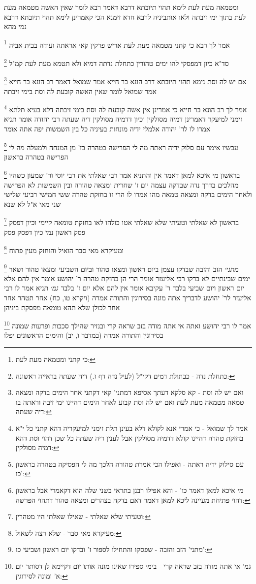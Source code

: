 \documentclass[12pt, openany]{book}
\newcommand{\footnotecomment}[1]{
	\renewcommand\thefootnote{}
	\footnote{#1}}
\newcommand{\commenta}[1]{\footnotecomment{#1}}
\begin{document}
{{ומטמאה מעת לעת לימא תהוי תיובתא דרבא דאמר רבא לומר שאין האשה מטמאה מעת לעת בתוך ימי זיבתה 
ולאו אותביניה לרבא חדא זימנא הכי קאמרינן לימא תהוי תיובתא דרבא נמי מהא 
\commenta{כי קתני ומטמאה מעת לעת:}
אמר לך רבא כי קתני מטמאה מעת לעת אריש פרקין קאי אראתה ועודה בבית אביה 
\commenta{כתחלת נדה - כבתולת דמים דקי"ל (לעיל נדה דף ז.) דיה שעתה בראייה ראשונה:}
סד"א כיון דמפסקי להו ימים טהורין כתחלת נדתה דמיא ולא תטמא מעת לעת קמ"ל
\commenta{ואם יש לה וסת - קא סלקא דעתך אסיפא דמתני' קאי דקתני אחר הימים בדקה ומצאה טמאה מטמאה מעת לעת ואם יש לה וסת קבוע לאחר הימים דהיינו ימי זיבה וראתה בו דיה שעתה:}
אם יש לה וסת נימא תהוי תיובתא דרב הונא בר חייא אמר שמואל דאמר רב הונא בר חייא אמר שמואל לומר שאין האשה קובעת לה וסת בימי זיבתה 
\commenta{אמר לך שמואל - כי אמרי אנא לקולא דלא בעינן תלת זימני למיעקריה דהא קתני כל י"א בחזקת טהרה דהיינו קולא דדמיה מסולקין אבל לענין דיה שעתה כל שכן דהוי וסת דהא דמיה מסולקין:}
אמר לך רב הונא בר חייא כי אמרינן אין אשה קובעת לה וסת בימי זיבתה דלא בעיא תלתא זימני למיעקר דאמרינן דמיה מסולקין וכיון דדמיה מסולקין דיה שעתה
רבי יהודה אומר תניא אמרו לו לר' יהודה אלמלי ידיה מונחות בעיניה כל בין השמשות יפה אתה אומר
\commenta{עם סילוק ידיה ראתה - ואפילו הכי אמרת טהורה הלכך מה לי הפסיקה בטהרה בראשון כו':}
עכשיו אימר עם סלוק ידיה ראתה מה לי הפרישה בטהרה בז' מן המנחה ולמעלה מה לי הפרישה בטהרה בראשון 
\commenta{מי איכא למאן דאמר כו' - והא אפילו רבנן בתראי בשני שלה הוא דקאמרי אבל בראשון דהוי פתיחת מעיינה ליכא למאן דאמר דאם בדקה בצהרים ומצאה טהור דתהוי הפרשה:}
בראשון מי איכא למאן דאמר 
אין והתניא אמר רבי שאלתי את רבי יוסי ור' שמעון כשהיו מהלכים בדרך נדה שבדקה עצמה יום ז' שחרית ומצאה טהורה ובין השמשות לא הפרישה ולאחר הימים בדקה ומצאה טמאה מהו 
אמרו לו הרי זו בחזקת טהרה ששי חמישי רביעי שלישי שני מאי א"ל לא שנא 
\commenta{וטעיתי שלא שאלתי - שאילו שאלתי היו מטהרין:}
בראשון לא שאלתי וטעיתי שלא שאלתי אטו כולהו לאו בחזקת טומאה קיימי וכיון דפסק פסק ראשון נמי כיון דפסק פסק 
\commenta{מעיקרא מאי סבר - שלא רצה לשאול:}
ומעיקרא מאי סבר הואיל והוחזק מעין פתוח
\commenta{מתני' הזב והזבה - שפסקו והתחילו לספור ז' ובדקו יום ראשון ושביעי כו':}
{\large\emph{מתני׳}} הזב והזבה שבדקו עצמן ביום ראשון ומצאו טהור וביום השביעי ומצאו טהור ושאר ימים שבינתיים לא בדקו רבי אליעזר אומר הרי הן בחזקת טהרה ר' יהושע אומר אין להם אלא יום ראשון ויום שביעי בלבד ר' עקיבא אומר אין להם אלא יום ז' בלבד
{\large\emph{גמ׳}} תניא אמר לו רבי אליעזר לר' יהושע לדבריך אתה מונה בסירוגין והתורה אמרה (ויקרא טו, כח) אחר תטהר אחר אחר לכולן שלא תהא טומאה מפסקת ביניהן 
\commenta{גמ' אי אתה מודה בזב שראה קרי - בימי ספירו שאינו מונה אותו יום דקיימא לן דסותר יום א' ומונה לסירוגין:}
אמר לו רבי יהושע ואתה אי אתה מודה בזב שראה קרי ובנזיר שהילך סככות ופרעות שמונה בסירוגין והתורה אמרה (במדבר ו, יב) והימים הראשונים יפלו 
}}
\end{document}
